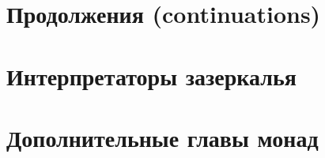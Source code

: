 \documentclass[12pt]{article}
\begin{document}
    \section{Продолжения (continuations)} \label{sec:continuations}












    \cite{reynolds1972definitional, reynolds1998definitional, defunctionalization-slides}



    \section{Интерпретаторы зазеркалья} \label{sec:wonder-interpreters}










    \section{Дополнительные главы монад}


\end{document}
